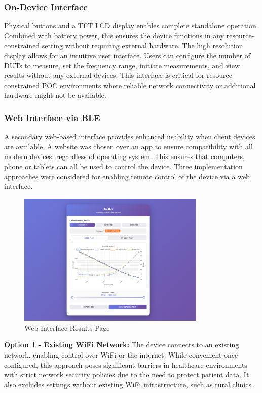 \subsubsection{On-Device Interface}
Physical buttons and a TFT LCD display enables complete standalone operation. Combined with battery power, this ensures the device functions in any resource-constrained setting without requiring external hardware. The high resolution display allows for an intuitive user interface. Users can configure the number of \acp{DUT} to measure, set the frequency range, initiate measurements, and view results without any external devices. This interface is critical for resource constrained \ac{POC} environments where reliable network connectivity or additional hardware might not be available.

\subsubsection{Web Interface via BLE}
A secondary web-based interface provides enhanced usability when client devices are available. A website was chosen over an app to ensure compatibility with all modern devices, regardless of operating system. This ensures that computers, phone or tablets can all be used to control the device. Three implementation approaches were considered for enabling remote control of the device via a web interface.

\begin{figure}[H]
    \centering
    \includegraphics[width=0.8\textwidth]{BioPal WebUI.png}
    \caption{Web Interface Results Page}
    \label{fig:web_ui_results}
\end{figure}

\textbf{Option 1 - Existing WiFi Network:} The device connects to an existing network, enabling control over WiFi or the internet. While convenient once configured, this approach poses significant barriers in healthcare environments with strict network security policies due to the need to protect patient data. It also excludes settings without existing WiFi infrastructure, such as rural clinics.


